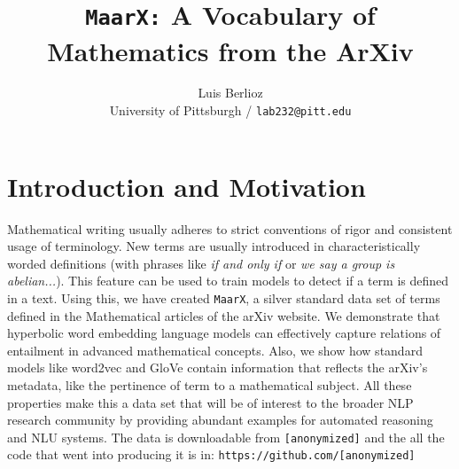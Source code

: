 \documentclass[11pt,a4paper]{article}
\title{\texttt{MaarX:} A Vocabulary of Mathematics from the ArXiv}
\author{Luis Berlioz\\
    University of Pittsburgh / \texttt{lab232@pitt.edu} }
\date{}
\begin{document}
\maketitle
\begin{abstract}
    
\end{abstract}

\section{Introduction and Motivation}
Mathematical writing usually adheres to strict conventions of rigor
and consistent usage of terminology.
New terms are usually introduced in characteristically worded 
definitions (with phrases like \textit{if
    and only if} or \textit{we say a group is abelian...}). 
This feature can be used to train models to detect if a term is defined in a text.
Using this, we have created \texttt{MaarX}, a silver standard data set of terms defined in
the Mathematical articles of the arXiv website.
We demonstrate that hyperbolic word embedding language models  
can effectively capture relations of entailment in advanced
mathematical concepts. Also, we show how standard models like word2vec
\cite{word2vec} and GloVe \cite{pennington2014glove} 
contain information that reflects the arXiv's metadata, like the
pertinence of term to a mathematical subject.
All these properties  make this a data set that will be of
interest to the broader NLP research community by providing abundant
examples for automated reasoning and NLU systems. The data is
downloadable from \texttt{[anonymized]} and the all the code that went
into producing it is in: \texttt{https://github.com/[anonymized]}

\end{document}
